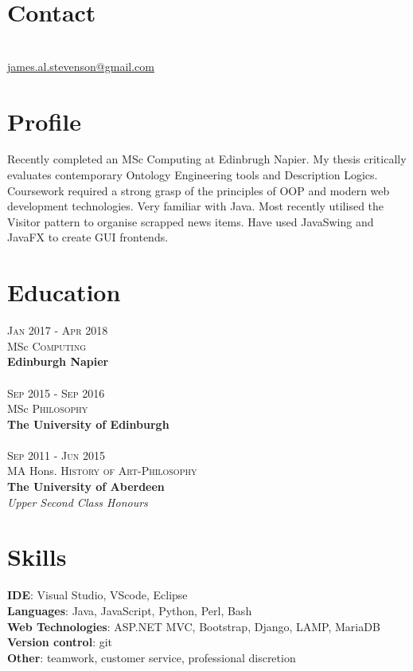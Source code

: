 \documentclass[12pt, a4paper]{article}
\begin{document}
\par{\bigskip\par}
\section{Contact}
\large{}\\
\href{mailto:james.al.stevenson@gmail.com}{james.al.stevenson@gmail.com}\\

\begin{multicols}{2}

\section{Profile}
Recently completed an MSc Computing at Edinbrugh Napier.
My thesis critically evaluates contemporary Ontology Engineering tools and Description Logics.
Coursework required a strong grasp of the principles of OOP and modern web development technologies.
Very familiar with Java.
Most recently utilised the Visitor pattern to organise scrapped news items.
Have used JavaSwing and JavaFX to create GUI frontends.

\section{Education}
\textsc{Jan} 2017 - \textsc{Apr} 2018\\
MSc \textsc{Computing} \\
\textbf{Edinburgh Napier}\\~\\
\textsc{Sep} 2015 - \textsc{Sep} 2016\\
MSc \textsc{Philosophy} \\ 
\textbf{The University of Edinburgh}\\~\\
\textsc{Sep} 2011 - \textsc{Jun} 2015\\
MA Hons. \textsc{History of Art}-\textsc{Philosophy}\\ 
\textbf{The University of Aberdeen}\\ 
\small\emph{Upper Second Class Honours}\\

\section{Skills}
\large{\textbf{IDE}: Visual Studio, VScode, Eclipse\\
\textbf{Languages}: Java, JavaScript, Python, Perl, Bash\\
\textbf{Web Technologies}: ASP.NET MVC, Bootstrap, Django, LAMP, MariaDB\\
\textbf{Version control}: git\\
\textbf{Other}: teamwork, customer service, professional discretion\\}



\end{multicols}
\end{document}
